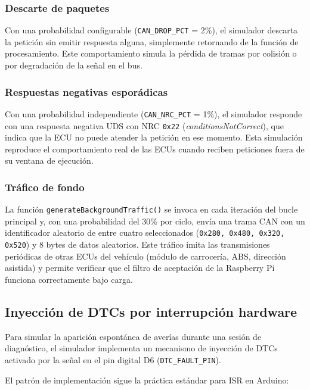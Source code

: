 \subsubsection{Descarte de paquetes}

Con una probabilidad configurable (\texttt{CAN\_DROP\_PCT} = 2\%), el simulador descarta la petición sin emitir respuesta alguna, simplemente retornando de la función de procesamiento. Este comportamiento simula la pérdida de tramas por colisión o por degradación de la señal en el bus.

\subsubsection{Respuestas negativas esporádicas}

Con una probabilidad independiente (\texttt{CAN\_NRC\_PCT} = 1\%), el simulador responde con una respuesta negativa UDS con NRC \texttt{0x22} (\textit{conditionsNotCorrect}), que indica que la ECU no puede atender la petición en ese momento. Esta simulación reproduce el comportamiento real de las ECUs cuando reciben peticiones fuera de su ventana de ejecución.

\subsubsection{Tráfico de fondo}

La función \texttt{generateBackgroundTraffic()} se invoca en cada iteración del bucle principal y, con una probabilidad del 30\% por ciclo, envía una trama CAN con un identificador aleatorio de entre cuatro seleccionados (\texttt{0x280, 0x480, 0x320, 0x520}) y 8 bytes de datos aleatorios. Este tráfico imita las transmisiones periódicas de otras ECUs del vehículo (módulo de carrocería, ABS, dirección asistida) y permite verificar que el filtro de aceptación de la Raspberry Pi funciona correctamente bajo carga.


\subsection{Inyección de DTCs por interrupción hardware}

Para simular la aparición espontánea de averías durante una sesión de diagnóstico, el simulador implementa un mecanismo de inyección de DTCs activado por la señal en el pin digital D6 (\texttt{DTC\_FAULT\_PIN}).

El patrón de implementación sigue la práctica estándar para ISR en Arduino:

